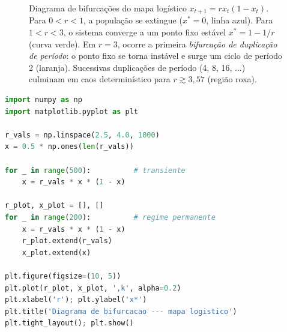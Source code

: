 \begin{figure}[htbp]
\centering
{}
\caption{Diagrama de bifurcações do mapa logístico $x_{t+1} = r x_t(1 - x_t)$. Para $0 < r < 1$, a população se extingue ($x^* = 0$, linha azul). Para $1 < r < 3$, o sistema converge a um ponto fixo estável $x^* = 1 - 1/r$ (curva verde). Em $r = 3$, ocorre a primeira \emph{bifurcação de duplicação de período}: o ponto fixo se torna instável e surge um ciclo de período 2 (laranja). Sucessivas duplicações de período (4, 8, 16, ...) culminam em caos determinístico para $r \gtrsim 3{,}57$ (região roxa).}
\label{fig:04-logistico}
\end{figure}

\begin{lstlisting}[language=Python, caption=Diagrama de bifurcacao do mapa logistico]
import numpy as np
import matplotlib.pyplot as plt

r_vals = np.linspace(2.5, 4.0, 1000)
x = 0.5 * np.ones(len(r_vals))

for _ in range(500):          # transiente
    x = r_vals * x * (1 - x)

r_plot, x_plot = [], []
for _ in range(200):          # regime permanente
    x = r_vals * x * (1 - x)
    r_plot.extend(r_vals)
    x_plot.extend(x)

plt.figure(figsize=(10, 5))
plt.plot(r_plot, x_plot, ',k', alpha=0.2)
plt.xlabel('r'); plt.ylabel('x*')
plt.title('Diagrama de bifurcacao --- mapa logistico')
plt.tight_layout(); plt.show()
\end{lstlisting}

